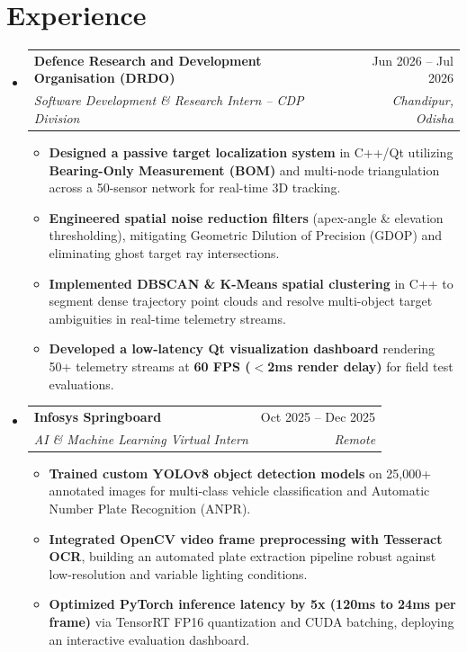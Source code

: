 \documentclass[letterpaper,10pt]{article}
\makeatletter
\newcommand{\resumeItem}[1]{
  \item\small{
    {#1 \vspace{-2pt}}
  }
}
\newcommand{\resumeSubheading}[4]{
  \vspace{-1pt}\item
    \begin{tabular*}{\textwidth}[t]{l@{\extracolsep{\fill}}r}
      \textbf{#1} & #2 \\
      \textit{\small#3} & \textit{\small #4} \\
    \end{tabular*}\vspace{-5pt}
}
\newcommand{\resumeItemListStart}{\begin{itemize}[leftmargin=15pt, label={$\bullet$}]}
\newcommand{\resumeItemListEnd}{\end{itemize}\vspace{-5pt}}
\makeatother
\begin{document}
\section{Experience}
  \begin{itemize}[leftmargin=0.15in, label={}]

    \resumeSubheading
      {Defence Research and Development Organisation (DRDO)}{Jun 2026 -- Jul 2026}
      {Software Development \& Research Intern -- CDP Division}{Chandipur, Odisha}
      \resumeItemListStart
        \resumeItem{\textbf{Designed a passive target localization system} in C++/Qt utilizing \textbf{Bearing-Only Measurement (BOM)} and multi-node triangulation across a 50-sensor network for real-time 3D tracking.}
        \resumeItem{\textbf{Engineered spatial noise reduction filters} (apex-angle \& elevation thresholding), mitigating Geometric Dilution of Precision (GDOP) and eliminating ghost target ray intersections.}
        \resumeItem{\textbf{Implemented DBSCAN \& K-Means spatial clustering} in C++ to segment dense trajectory point clouds and resolve multi-object target ambiguities in real-time telemetry streams.}
        \resumeItem{\textbf{Developed a low-latency Qt visualization dashboard} rendering 50+ telemetry streams at \textbf{60 FPS ($<$2ms render delay)} for field test evaluations.}
      \resumeItemListEnd

    \resumeSubheading
      {Infosys Springboard}{Oct 2025 -- Dec 2025}
      {AI \& Machine Learning Virtual Intern}{Remote}
      \resumeItemListStart
        \resumeItem{\textbf{Trained custom YOLOv8 object detection models} on 25,000+ annotated images for multi-class vehicle classification and Automatic Number Plate Recognition (ANPR).}
        \resumeItem{\textbf{Integrated OpenCV video frame preprocessing with Tesseract OCR}, building an automated plate extraction pipeline robust against low-resolution and variable lighting conditions.}
        \resumeItem{\textbf{Optimized PyTorch inference latency by 5x (120ms to 24ms per frame)} via TensorRT FP16 quantization and CUDA batching, deploying an interactive evaluation dashboard.}
      \resumeItemListEnd

  \end{itemize}


\end{document}
